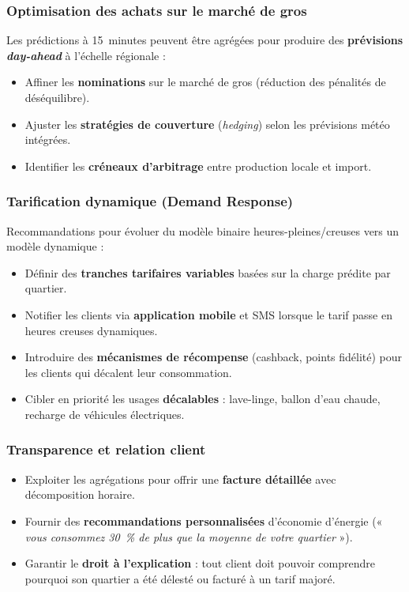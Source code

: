 \documentclass[11pt,a4paper]{article}
\begin{document}
\subsubsection{Optimisation des achats sur le marché de gros}
Les prédictions à 15~minutes peuvent être agrégées pour produire des \textbf{prévisions \emph{day-ahead}} à l'échelle régionale :
\begin{itemize}
  \item Affiner les \textbf{nominations} sur le marché de gros (réduction des pénalités de déséquilibre).
  \item Ajuster les \textbf{stratégies de couverture} (\emph{hedging}) selon les prévisions météo intégrées.
  \item Identifier les \textbf{créneaux d'arbitrage} entre production locale et import.
\end{itemize}

\subsubsection{Tarification dynamique (Demand Response)}
Recommandations pour évoluer du modèle binaire heures-pleines/creuses vers un modèle dynamique :
\begin{itemize}
  \item Définir des \textbf{tranches tarifaires variables} basées sur la charge prédite par quartier.
  \item Notifier les clients via \textbf{application mobile} et SMS lorsque le tarif passe en heures creuses dynamiques.
  \item Introduire des \textbf{mécanismes de récompense} (cashback, points fidélité) pour les clients qui décalent leur consommation.
  \item Cibler en priorité les usages \textbf{décalables} : lave-linge, ballon d'eau chaude, recharge de véhicules électriques.
\end{itemize}

\subsubsection{Transparence et relation client}
\begin{itemize}
  \item Exploiter les agrégations pour offrir une \textbf{facture détaillée} avec décomposition horaire.
  \item Fournir des \textbf{recommandations personnalisées} d'économie d'énergie (« \emph{vous consommez 30~\% de plus que la moyenne de votre quartier} »).
  \item Garantir le \textbf{droit à l'explication} : tout client doit pouvoir comprendre pourquoi son quartier a été délesté ou facturé à un tarif majoré.
\end{itemize}
\end{document}
